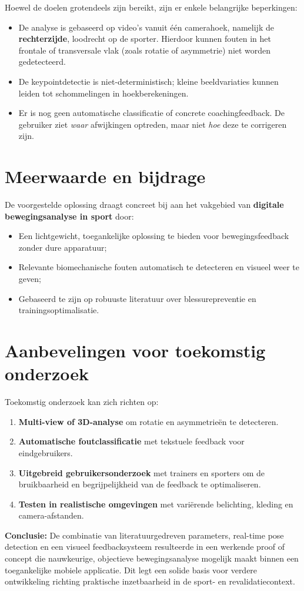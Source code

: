 Hoewel de doelen grotendeels zijn bereikt, zijn er enkele belangrijke beperkingen:

\begin{itemize}
    \item De analyse is gebaseerd op video’s vanuit één camerahoek, namelijk de \textbf{rechterzijde}, loodrecht op de sporter. Hierdoor kunnen fouten in het frontale of transversale vlak (zoals rotatie of asymmetrie) niet worden gedetecteerd.
    \item De keypointdetectie is niet-deterministisch; kleine beeldvariaties kunnen leiden tot schommelingen in hoekberekeningen.
    \item Er is nog geen automatische classificatie of concrete coachingfeedback. De gebruiker ziet \textit{waar} afwijkingen optreden, maar niet \textit{hoe} deze te corrigeren zijn.
\end{itemize}

\section{Meerwaarde en bijdrage}

De voorgestelde oplossing draagt concreet bij aan het vakgebied van \textbf{digitale bewegingsanalyse in sport} door:
\begin{itemize}
    \item Een lichtgewicht, toegankelijke oplossing te bieden voor bewegingsfeedback zonder dure apparatuur;
    \item Relevante biomechanische fouten automatisch te detecteren en visueel weer te geven;
    \item Gebaseerd te zijn op robuuste literatuur over blessurepreventie en trainingsoptimalisatie.
\end{itemize}

\section{Aanbevelingen voor toekomstig onderzoek}

Toekomstig onderzoek kan zich richten op:
\begin{enumerate}
    \item \textbf{Multi-view of 3D-analyse} om rotatie en asymmetrieën te detecteren.
    \item \textbf{Automatische foutclassificatie} met tekstuele feedback voor eindgebruikers.
    \item \textbf{Uitgebreid gebruikersonderzoek} met trainers en sporters om de bruikbaarheid en begrijpelijkheid van de feedback te optimaliseren.
    \item \textbf{Testen in realistische omgevingen} met variërende belichting, kleding en camera-afstanden.
\end{enumerate}

\noindent
\textbf{Conclusie:} De combinatie van literatuurgedreven parameters, real-time pose detection en een visueel feedbacksysteem resulteerde in een werkende proof of concept die nauwkeurige, objectieve bewegingsanalyse mogelijk maakt binnen een toegankelijke mobiele applicatie. 
Dit legt een solide basis voor verdere ontwikkeling richting praktische inzetbaarheid in de sport- en revalidatiecontext.


